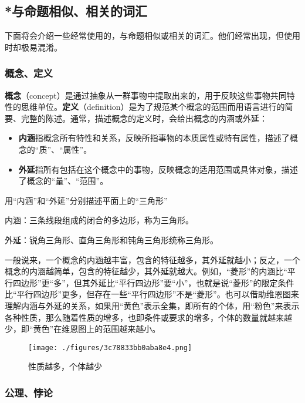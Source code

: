 \subsection{*与命题相似、相关的词汇}

下面将会介绍一些经常使用的，与命题相似或相关的词汇。他们经常出现，但使用时却极易混淆。

\subsubsection{概念、定义}

\textbf{概念}（concept）是通过抽象从一群事物中提取出来的，用于反映这些事物共同特性的思维单位。\textbf{定义}（definition）是为了规范某个概念的范围而用语言进行的简要、完整的陈述。通常，描述概念的定义时，会给出概念的内涵或外延：
\begin{itemize}
\item \textbf{内涵}指概念所有特性和关系，反映所指事物的本质属性或特有属性，描述了概念的“质”、“属性”。
\item \textbf{外延}指所有包括在这个概念中的事物，反映概念的适用范围或具体对象，描述了概念的“量”、“范围”。
\end{itemize}

\begin{example}{用“内涵”和“外延”分别描述平面上的“三角形”}

内涵：三条线段组成的闭合的多边形，称为三角形。

外延：锐角三角形、直角三角形和钝角三角形统称三角形。
\end{example}

一般说来，一个概念的内涵越丰富，包含的特征越多，其外延就越小；反之，一个概念的内涵越简单，包含的特征越少，其外延就越大。例如，“菱形”的内涵比“平行四边形”更“多”，但其外延比“平行四边形”要“小”，也就是说“菱形”的限定条件比“平行四边形”更多，但存在一些“平行四边形”不是“菱形”。也可以借助维恩图来理解内涵与外延的关系，如果用“黄色”表示全集，即所有的个体，用“粉色”来表示各种性质，那么随着性质的增多，也即条件或要求的增多，个体的数量就越来越少，即“黄色”在维恩图上的范围越来越小。
\begin{figure}[ht]
\centering
\texttt{[image: ./figures/3c78833bb0aba8e4.png]}
\caption{性质越多，个体越少}\label{fig_SufCnd_6}
\end{figure}

\subsubsection{公理、悖论}

